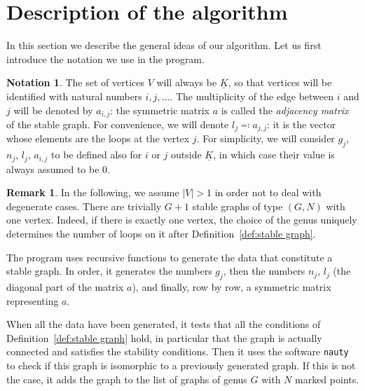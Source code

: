 \documentclass{amsart}
\theoremstyle{plain}
\theoremstyle{definition}
\newtheorem{remark}[theorem]{Remark}
\newtheorem{notation}[theorem]{Notation}
\newcommand{\abs}[1]{\left|#1\right|}
\newcommand{\ubar}[1]{\underline{#1}}
\begin{document}
\section{Description of the algorithm}\label{sec:description}

In this section we describe the general ideas of our algorithm. Let us
first introduce the notation we use in the program.

\begin{notation}\label{not:gnla}
  The set of vertices $V$ will always be $\ubar{K}$, so that vertices
  will be identified with natural numbers $i, j, \dots$. The
  multiplicity of the edge between $i$ and $j$ will be denoted by
  $a_{i,j}$: the symmetric matrix $a$ is called the \emph{adjacency
    matrix} of the stable graph. For convenience, we will denote $l_j
  \eqqcolon a_{j,j}$: it is the vector whose elements are the loops at
  the vertex $j$. For simplicity, we will consider $g_j$, $n_j$,
  $l_j$, $a_{i,j}$ to be defined also for $i$ or $j$ outside
  $\ubar{K}$, in which case their value is always assumed to be $0$.
\end{notation}

\begin{remark}
  In the following, we assume $\abs{V} > 1$ in order not to deal with
  degenerate cases. There are trivially $G+1$ stable graphs of type
  $(G, N)$ with one vertex. Indeed, if there is exactly one vertex,
  the choice of the genus uniquely determines the number of loops on
  it after Definition~\ref{def:stable graph}.
\end{remark}

The program uses recursive functions to generate the data that
constitute a stable graph. In order, it generates the numbers $g_j$,
then the numbers $n_j$, $l_j$ (the diagonal part of the matrix $a$),
and finally, row by row, a symmetric matrix representing $a$.

When all the data have been generated, it tests that all the
conditions of Definition~\ref{def:stable graph} hold, in particular
that the graph is actually connected and satisfies the stability
conditions. Then it uses the software \texttt{nauty}~\cite{nauty} to
check if this graph is isomorphic to a previously generated graph. If
this is not the case, it adds the graph to the list of graphs of genus
$G$ with $N$ marked points.

\end{document}
